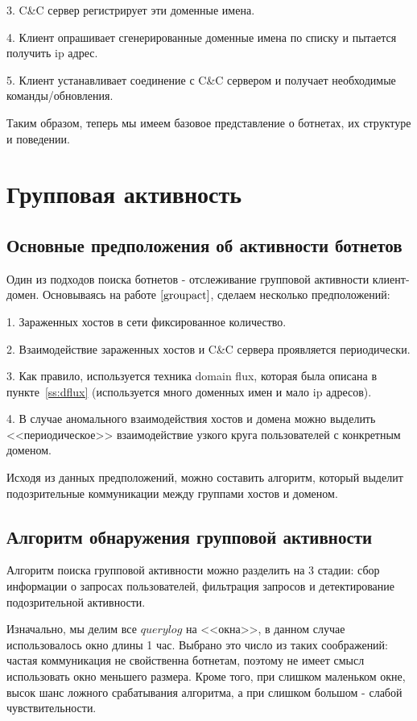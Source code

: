 \documentclass[a4paper,14pt]{extreport} %
\begin{document}
	
3. C\&C сервер регистрирует эти доменные имена.
	
4. Клиент опрашивает сгенерированные доменные имена по списку и пытается получить ip адрес.
	
5. Клиент устанавливает соединение с C\&C сервером и получает необходимые команды/обновления.
	
Таким образом, теперь мы имеем базовое представление о ботнетах, их структуре и поведении.

\chapter{Групповая активность}
\label{chap:groupact}
\section{Основные предположения об активности ботнетов}
Один из подходов поиска ботнетов - отслеживание групповой активности клиент-домен. Основываясь на работе $\cite{groupact}$, сделаем несколько предположений:
	
1. Зараженных хостов в сети фиксированное количество.
	
2. Взаимодействие зараженных хостов и C\&C сервера проявляется периодически.
	
3. Как правило, используется техника domain flux, которая была описана в пункте~\ref{ss:dflux} (используется много доменных имен и мало ip адресов).

4. В случае аномального взаимодействия хостов и домена можно выделить <<периодическое>> взаимодействие узкого круга пользователей с конкретным доменом.
	
Исходя из данных предположений, можно составить алгоритм, который выделит подозрительные коммуникации между группами хостов и доменом.
	
\section{Алгоритм обнаружения групповой активности}
	
Алгоритм поиска групповой активности можно разделить на 3 стадии: сбор информации о запросах пользователей, фильтрация запросов и детектирование подозрительной активности. 
	
Изначально, мы делим все $querylog$ на <<окна>>, в данном случае использовалось окно длины 1 час. Выбрано это число из таких соображений: частая коммуникация не свойственна ботнетам, поэтому не имеет смысл использовать окно меньшего размера. Кроме того, при слишком маленьком окне, высок шанс ложного срабатывания алгоритма, а при слишком большом - слабой чувствительности.
	
\end{document}
